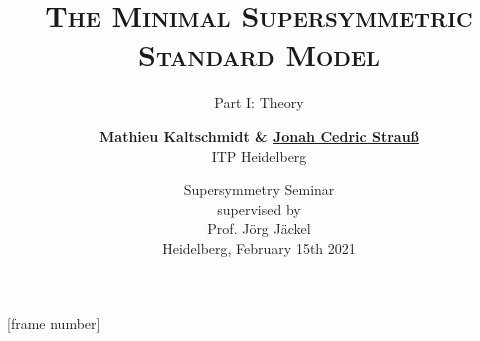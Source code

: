 
\title{\LARGE\textsc{The Minimal Supersymmetric Standard Model}}
\subtitle{\large Part I: Theory}
\author{\textbf{\large Mathieu Kaltschmidt \& \underline{Jonah Cedric Strau\ss}} \\[0.5em]ITP Heidelberg}
\date{Supersymmetry Seminar\\
supervised by \\ Prof. J\"org J\"ackel \\[1em]
Heidelberg, February 15th 2021}




\beamertemplatenavigationsymbolsempty
{}



\usepackage{fontspec}


[frame number]

\usepackage{amsmath}
\usepackage{amssymb}

\usepackage{polyglossia}
\setmainlanguage{english}


\usepackage{appendixnumberbeamer}
\usepackage{booktabs}
\usepackage{siunitx}
\usepackage{graphicx}
\usepackage{float}
\usepackage{blindtext}
\usepackage{physics}
\usepackage[labelfont=bf]{caption}

\usepackage{xcolor}

\usepackage{xfrac}

\usepackage[
	bibstyle=numeric-comp,
	backend=biber,
	isbn=false,
	date=year,
	url=false,
	doi=false,
	hyperref = auto, 
	maxnames=99,
	backref, 
	backrefstyle=none]{biblatex}


